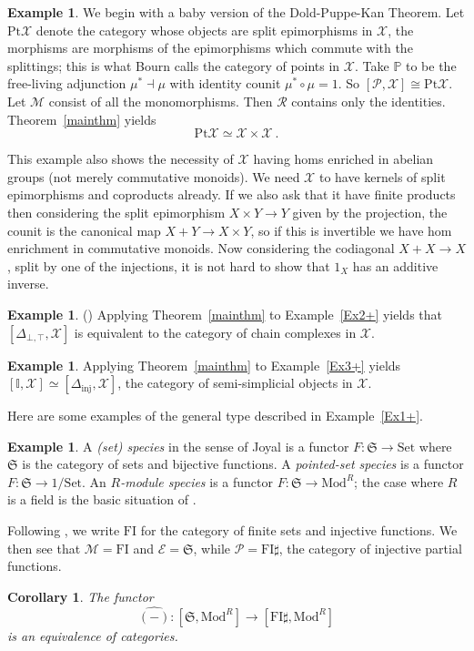 \documentclass[a4paper,12pt,reqno]{amsart}
\newtheorem{corollary}[theorem]{Corollary}
\theoremstyle{definition}
\newtheorem{example}[theorem]{Example}
\theoremstyle{fact}
\theoremstyle{genquest}
\theoremstyle{step}
\newcommand{\lra}{\longrightarrow}
\newcommand{\ra}{\rightarrow}
\def\CE{{\mathscr E}}
\def\CM{{\mathscr M}}
\def\CP{{\mathscr P}}
\def\CR{{\mathscr R}}
\def\CX{{\mathscr X}}
\begin{document}
\begin{example}\label{babyDPK} 
We begin with a baby version of the Dold-Puppe-Kan Theorem.
Let $\mathrm{Pt}\CX$ denote the category whose objects are split epimorphisms in $\CX$, the morphisms are morphisms of the epimorphisms
which commute with the splittings; this is what Bourn \cite{Bourn91} calls the category of points in $\CX$.  
Take $\mathbb{P}$ to be the free-living adjunction $\mu^*\dashv \mu$ with identity counit $\mu^*\circ \mu = 1$.
So $[\CP,\CX] \cong \mathrm{Pt}\CX$.  
Let $\CM$ consist of all the monomorphisms. 
Then $\CR$ contains only the identities. 
Theorem~\ref{mainthm} yields $$\mathrm{Pt}\CX \simeq \CX \times \CX \ .$$

This example also shows the necessity of $\CX$ having homs enriched in abelian groups (not merely commutative monoids). 
We need $\CX$ to have kernels of split epimorphisms and coproducts already. 
If we also ask that it have finite products then considering the split epimorphism $X\times Y\ra Y$ given by the projection, the counit 
is the canonical map $X+Y \ra X\times Y$, 
so if this is invertible we have hom enrichment in commutative monoids. 
Now considering the codiagonal $X+ X\ra X$, split by one of the 
injections, it is not hard to show that $1_X$ has an additive inverse. 
\end{example}

\begin{example}\label{DPK} (\cite{Dold, DoldPuppe, Kan}) Applying Theorem~\ref{mainthm} to 
Example~\ref{Ex2+} yields that $[\Delta_{\bot,\top},\CX]$ is equivalent to 
the category of chain complexes in $\CX$.
\end{example}

\begin{example} 
Applying Theorem~\ref{mainthm} to Example~\ref{Ex3+} yields 
$[\mathbb{I},\CX] \simeq [\Delta_{\mathrm{inj}},\CX]$, the category of semi-simplicial objects in $\CX$.
\end{example}
\bigskip

Here are some examples of the general type described in Example~\ref{Ex1+}.
\bigskip

\begin{example} A {\em (set) species} in the sense of Joyal \cite{Species} is a functor 
$F : \mathfrak{S} \lra \mathrm{Set}$
where $\mathfrak{S}$ is the category of sets and bijective functions. 
A {\em pointed-set species} is a functor 
$F : \mathfrak{S} \lra 1/\mathrm{Set}$.
An {\em $R$-module species} is a functor 
$F : \mathfrak{S} \lra \mathrm{Mod}^R$; the case where $R$ is
a field is the basic situation of \cite{AnalFunct}.

Following \cite{CEF2012}, we write $\mathrm{FI}$ for the category of finite sets
and injective functions. We then see that 
$\CM = \mathrm{FI}$ and $\CE = \mathfrak{S}$,
while $\CP = \mathrm{FI}\sharp$, the category of injective partial functions.  

\begin{corollary} \cite{CEF2012} The functor
$$\widehat{(-)} : [\mathfrak{S}, \mathrm{Mod}^R] \lra [\mathrm{FI}\sharp, \mathrm{Mod}^R]$$
is an equivalence of categories.
\end{corollary}
\end{example}
\end{document}
